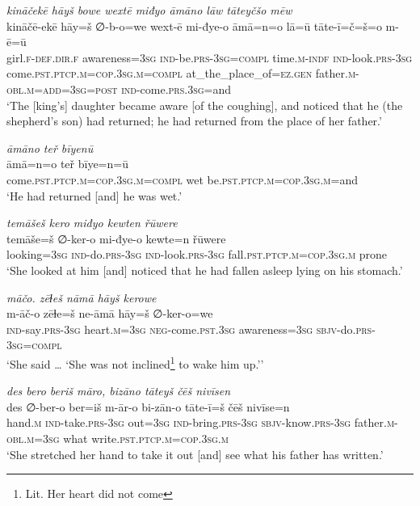 \ea \label{KŠ.65}
\textit{kināčekē hāyš bowe wextē miđyo āmāno lāw tāteyčšo mēw} \\ 
\gll kināčē-ekē hāy=š ∅-b-o=we wext-ē mi-đye-o āmā=n=o lā=ū tāte-ī=č=š=o m-ē=ū \\ 
 girl\textsc{.f}\textsc{-def}\textsc{.dir}\textsc{.f} awareness\textsc{=3sg} \textsc{ind-}be\textsc{.prs}\textsc{-3sg}\textsc{=compl} time\textsc{.m}\textsc{-indf} \textsc{ind-}look\textsc{.prs}\textsc{-3sg} come\textsc{.pst}\textsc{.ptcp}\textsc{.m}\textsc{=cop}\textsc{.3sg}\textsc{.m}\textsc{=compl} at\_the\_place\_of\textsc{\textsc{=ez.gen}} father\textsc{.m}\textsc{-obl}\textsc{.m}\textsc{=add}\textsc{=3sg}\textsc{=\textsc{post}} \textsc{ind-}come\textsc{.prs}\textsc{.3sg}=and \\ 
\glt `The [king’s] daughter became aware [of the coughing], and noticed that he (the shepherd’s son) had returned; he had returned from the place of her father.'
\z 
 
\ea \label{KŠ.66}
\textit{āmāno teř bīyenū} \\ 
\gll āmā=n=o teř bīye=n=ū \\ 
 come\textsc{.pst}\textsc{.ptcp}\textsc{.m}\textsc{=cop}\textsc{.3sg}\textsc{.m}\textsc{=compl} wet be\textsc{.pst}\textsc{.ptcp}\textsc{.m}\textsc{=cop}\textsc{.3sg}\textsc{.m}=and \\ 
\glt `He had returned [and] he was wet.'
\z 
 
\ea \label{KŠ.67}
\textit{temāšeš kero miđyo kewten řūwere} \\ 
\gll temāše=š ∅-ker-o mi-đye-o kewte=n řūwere \\ 
 looking\textsc{=3sg} \textsc{ind-}do\textsc{.prs}\textsc{-3sg} \textsc{ind-}look\textsc{.prs}\textsc{-3sg} fall\textsc{.pst}\textsc{.ptcp}\textsc{.m}\textsc{=cop}\textsc{.3sg}\textsc{.m} prone \\ 
\glt `She looked at him [and] noticed that he had fallen asleep lying on his stomach.'
\z 
 
\ea \label{KŠ.69}
\textit{māčo. zēɫeš nāmā hāyš kerowe} \\ 
\gll m-āč-o zēɫe=š ne-āmā hāy=š ∅-ker-o=we \\ 
 \textsc{ind-}say\textsc{.prs}\textsc{-3sg} heart\textsc{.m}\textsc{=3sg} \textsc{neg-}come\textsc{.pst}\textsc{.3sg} awareness\textsc{=3sg} \textsc{sbjv-}do\textsc{.prs}\textsc{-3sg}\textsc{=compl} \\ 
\glt `She said … ‘She was not inclined\footnote{Lit. Her heart did not come} to wake him up.’'
\z 
 
\ea \label{KŠ.71}
\textit{des bero beriš māro, bizāno tāteyš čēš nivīsen} \\ 
\gll des ∅-ber-o ber=iš m-ār-o bi-zān-o tāte-ī=š čēš nivīse=n \\ 
 hand\textsc{.m} \textsc{ind-}take\textsc{.prs}\textsc{-3sg} out\textsc{=3sg} \textsc{ind-}bring\textsc{.prs}\textsc{-3sg} \textsc{sbjv-}know\textsc{.prs}\textsc{-3sg} father\textsc{.m}\textsc{-obl}\textsc{.m}\textsc{=3sg} what write\textsc{.pst}\textsc{.ptcp}\textsc{.m}\textsc{=cop}\textsc{.3sg}\textsc{.m} \\ 
\glt `She stretched her hand to take it out [and] see what his father has written.'
\z 
 
